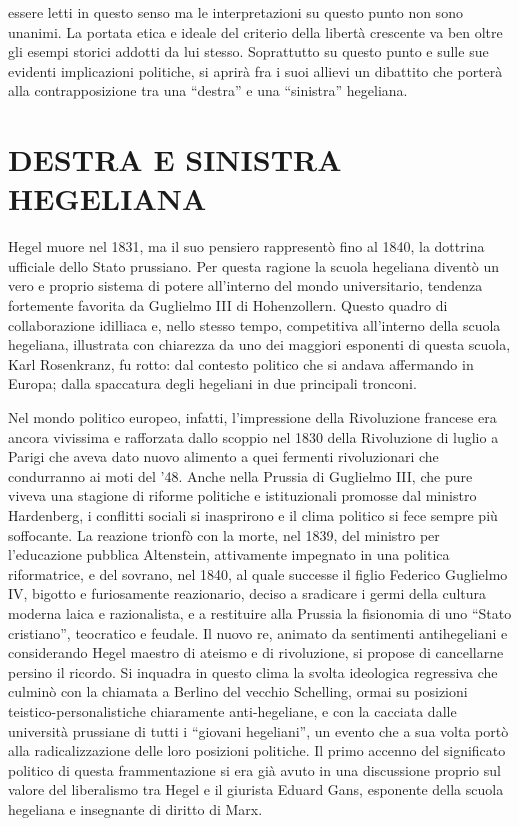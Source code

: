 \documentclass[a4paper,12pt,oneside,openany]{book}%
\begin{document}
essere letti in questo senso ma le interpretazioni su questo punto non sono unanimi. La portata etica e ideale del criterio della libertà crescente va ben oltre gli esempi storici addotti da lui stesso. Soprattutto su questo punto e sulle sue evidenti implicazioni politiche, si aprirà fra i suoi allievi un dibattito che porterà alla contrapposizione tra una “destra” e una “sinistra” hegeliana.
\newpage	
	
\section{DESTRA E SINISTRA HEGELIANA}	
	
Hegel muore nel 1831, ma il suo pensiero rappresentò fino al 1840, la dottrina ufficiale dello Stato prussiano. Per questa ragione la scuola hegeliana diventò un vero e proprio sistema di potere all’interno del mondo universitario, tendenza fortemente favorita da Guglielmo III di Hohenzollern. Questo quadro di collaborazione idilliaca e, nello stesso tempo, competitiva all’interno della scuola hegeliana, illustrata con chiarezza da uno dei maggiori esponenti di questa scuola, Karl Rosenkranz, fu rotto: dal contesto politico che si andava affermando in Europa;
dalla spaccatura degli hegeliani in due principali tronconi.	

Nel mondo politico europeo, infatti, l’impressione della Rivoluzione francese era ancora vivissima e rafforzata dallo scoppio nel 1830 della Rivoluzione di luglio a Parigi che aveva dato nuovo alimento a quei fermenti rivoluzionari che condurranno ai moti del ’48. Anche nella Prussia di Guglielmo III, che pure viveva una stagione di riforme politiche e istituzionali promosse dal ministro Hardenberg, i conflitti sociali si inasprirono e il clima politico si fece sempre più soffocante. La reazione trionfò con la morte, nel 1839, del ministro per l’educazione pubblica Altenstein, attivamente impegnato in una politica riformatrice, e del sovrano, nel 1840, al quale successe il figlio Federico Guglielmo IV, bigotto e furiosamente reazionario, deciso a sradicare i germi della cultura moderna laica e razionalista, e a restituire alla Prussia la fisionomia di uno “Stato cristiano”, teocratico e feudale. Il nuovo re, animato da sentimenti antihegeliani e considerando Hegel maestro di ateismo e di rivoluzione, si propose di cancellarne persino il ricordo. Si inquadra in questo clima la svolta ideologica regressiva che culminò con la chiamata a Berlino del vecchio Schelling, ormai su posizioni teistico-personalistiche chiaramente anti-hegeliane, e con la cacciata dalle università prussiane di tutti i “giovani hegeliani”, un evento che a sua volta portò alla radicalizzazione delle loro posizioni politiche. Il primo accenno del significato politico di questa frammentazione si era già avuto in una discussione proprio sul valore del liberalismo tra Hegel e il giurista Eduard Gans, esponente della scuola hegeliana e insegnante di diritto di Marx.
\end{document}
